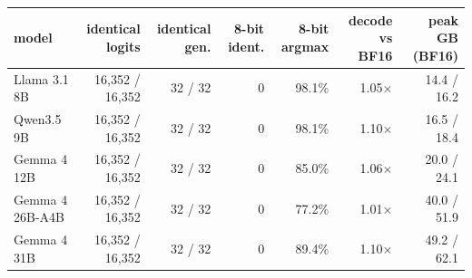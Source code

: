 \begin{tabular}{lrrrrrr}
\toprule
model & identical logits & identical gen. & 8-bit ident. & 8-bit argmax & decode vs BF16 & peak GB (BF16) \\
\midrule
Llama 3.1 8B & 16,352 / 16,352 & 32 / 32 & 0 & 98.1\% & 1.05$\times$ & 14.4 / 16.2 \\
Qwen3.5 9B & 16,352 / 16,352 & 32 / 32 & 0 & 98.1\% & 1.10$\times$ & 16.5 / 18.4 \\
Gemma 4 12B & 16,352 / 16,352 & 32 / 32 & 0 & 85.0\% & 1.06$\times$ & 20.0 / 24.1 \\
Gemma 4 26B-A4B & 16,352 / 16,352 & 32 / 32 & 0 & 77.2\% & 1.01$\times$ & 40.0 / 51.9 \\
Gemma 4 31B & 16,352 / 16,352 & 32 / 32 & 0 & 89.4\% & 1.10$\times$ & 49.2 / 62.1 \\
\bottomrule
\end{tabular}
